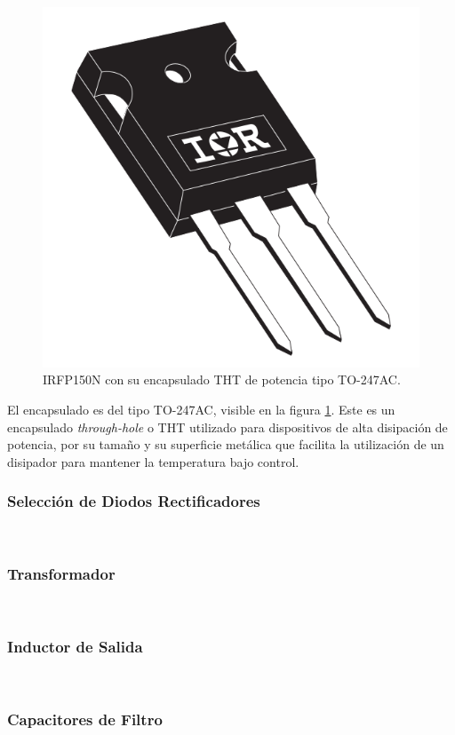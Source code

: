 \begin{figure}[h]
    \centering
    \includegraphics[scale=0.15]{Imagenes/IRFP150-TO247AC.png}
    \caption{IRFP150N con su encapsulado THT de potencia tipo TO-247AC.}
    \label{irfp150}
\end{figure}

El encapsulado es del tipo TO-247AC, visible en la figura \ref{irfp150}. Este es un encapsulado \textit{through-hole} o THT utilizado para dispositivos de alta disipación de potencia, por su tamaño y su superficie metálica que facilita la utilización de un disipador para mantener la temperatura bajo control.\\

\subsubsection{Selección de Diodos Rectificadores}

\lipsum[1]\\

\subsubsection{Transformador}

\lipsum[2]\\

\subsubsection{Inductor de Salida}

\lipsum[3]\\

\subsubsection{Capacitores de Filtro}

\lipsum[4]\\